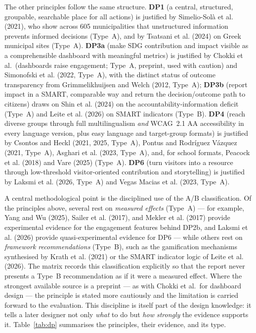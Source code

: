 \documentclass[11pt,a4paper]{article}
\begin{document}
The other principles follow the same structure. \textbf{DP1} (a central, structured, groupable, searchable place for all actions) is justified by Simelio-Sol\`a et al. (2021), who show across 605 municipalities that unstructured information prevents informed decisions (Type~A), and by Tsatsani et al. (2024) on Greek municipal sites (Type~A). \textbf{DP3a} (make SDG contribution and impact visible as a comprehensible dashboard with meaningful metrics) is justified by Chokki et al.\ (dashboards raise engagement; Type~A, preprint, used with caution) and Simonofski et al. (2022, Type~A), with the distinct status of outcome transparency from Grimmelikhuijsen and Welch (2012, Type~A); \textbf{DP3b} (report impact in a SMART, comparable way and return the decision/outcome path to citizens) draws on Shin et al. (2024) on the accountability-information deficit (Type~A) and Leite et al. (2026) on SMART indicators (Type~B). \textbf{DP4} (reach diverse groups through full multilingualism \emph{and} WCAG~2.1 AA accessibility in every language version, plus easy language and target-group formats) is justified by Csontos and Heckl (2021, 2025, Type~A), Pontus and Rodr\'iguez V\'azquez (2021, Type~A), Asghari et al. (2023, Type~A), and, for school formats, Peacock et al. (2018) and Vare (2025) (Type~A). \textbf{DP6} (turn visitors into a resource through low-threshold visitor-oriented contribution and storytelling) is justified by Laksmi et al. (2026, Type~A) and Vegas Macias et al. (2023, Type~A).

A central methodological point is the disciplined use of the A/B classification. Of the principles above, several rest on \emph{measured effects} (Type~A) --- for example, Yang and Wu (2025), Sailer et al. (2017), and Mekler et al. (2017) provide experimental evidence for the engagement features behind DP2b, and Laksmi et al. (2026) provide quasi-experimental evidence for DP6 --- while others rest on \emph{framework recommendations} (Type~B), such as the gamification mechanisms synthesised by Krath et al. (2021) or the SMART indicator logic of Leite et al. (2026). The matrix records this classification explicitly so that the report never presents a Type~B recommendation as if it were a measured effect. Where the strongest available source is a preprint --- as with Chokki et al.\ for dashboard design --- the principle is stated more cautiously and the limitation is carried forward to the evaluation. This discipline is itself part of the design knowledge: it tells a later designer not only \emph{what} to do but \emph{how strongly} the evidence supports it. Table~\ref{tab:dp} summarises the principles, their evidence, and its type.
\end{document}
